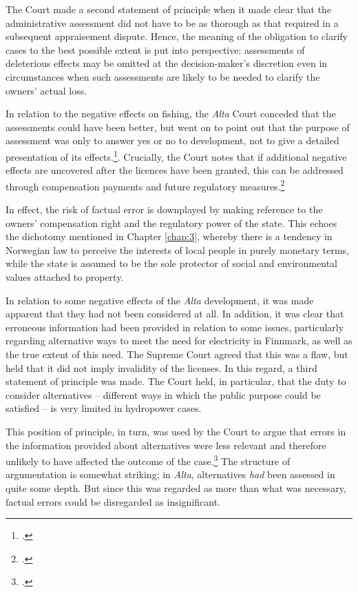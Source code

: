 The Court made a second statement of principle when it made clear that the administrative assessment did not have to be as thorough as that required in a subsequent appraisement dispute. Hence, the meaning of the obligation to clarify cases to the best possible extent is put into perspective: assessments of deleterious effects may be omitted at the decision-maker's discretion even in circumstances when such assessments are likely to be needed to clarify the owners'  actual loss.

In relation to the negative effects on fishing, the {\it Alta} Court conceded that the assessments could have been better, but went on to point out that the purpose of assessment was only to answer yes or no to development, not to give a detailed presentation of its effects.\footcite[330]{alta82}. Crucially, the Court notes that if additional negative effects are uncovered after the licences have been granted, this can be addressed through compensation payments and future regulatory measures.\footcite[330]{alta82}

In effect, the risk of factual error is downplayed by making reference to the owners' compensation right and the regulatory power of the state. This echoes the dichotomy mentioned in Chapter \ref{chap:3}, whereby there is a tendency in Norwegian law to perceive the interests of local people in purely monetary terms, while the state is assumed to be the sole protector of social and environmental values attached to property.

In relation to some negative effects of the {\it Alta} development, it was made apparent that they had not been considered at all. In addition, it was clear that erroneous information had been provided in relation to some issues, particularly regarding alternative ways to meet the need for electricity in Finnmark, as well as the true extent of this need. The Supreme Court agreed that this was a flaw, but held that it did not imply invalidity of the licenses. In this regard, a third statement of principle was made. The Court held, in particular, that the duty to consider alternatives -- different ways in which the public purpose could be satisfied -- is very limited in hydropower cases.

This position of principle, in turn, was used by the Court to argue that errors in the information provided about alternatives were less relevant and therefore unlikely to have affected the outcome of the case.\footcite[346]{alta82} The structure of argumentation is somewhat striking; in {\it Alta}, alternatives {\it had} been assessed in quite some depth. But since this was regarded as more than what was necessary, factual errors could be disregarded as insignificant.

